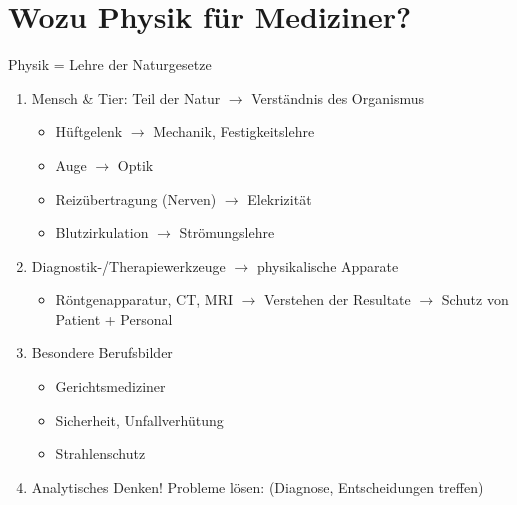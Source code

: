 \setcounter{chapter}{-1}
\chapter{Wozu Physik für Mediziner?}
Physik = Lehre der Naturgesetze
\begin{enumerate}
	\item Mensch \& Tier: Teil der Natur $\rightarrow$ Verständnis des Organismus
		\begin{bsp*}
			\begin{itemize}
				\item Hüftgelenk $\rightarrow$ Mechanik, Festigkeitslehre
				\item Auge $\rightarrow$ Optik
				\item Reizübertragung (Nerven) $\rightarrow$ Elekrizität
				\item Blutzirkulation $\rightarrow$ Strömungslehre
			\end{itemize}
		\end{bsp*}
	\item Diagnostik-/Therapiewerkzeuge $\rightarrow$ physikalische Apparate
		\begin{bsp*}
			\begin{itemize}
				\item Röntgenapparatur, CT, MRI $\rightarrow$ Verstehen der Resultate $\rightarrow$ Schutz von Patient + Personal
			\end{itemize}
		\end{bsp*}
	\item Besondere Berufsbilder
		\begin{itemize}
			\item Gerichtsmediziner
			\item Sicherheit, Unfallverhütung
			\item Strahlenschutz
		\end{itemize}
	\item Analytisches Denken! Probleme lösen: (Diagnose, Entscheidungen treffen)
\end{enumerate}
